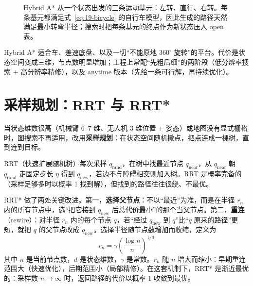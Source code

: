 \begin{figure}[htbp]
  \centering
  \caption{Hybrid A* 从一个状态出发的三条运动基元：左转、直行、右转。每条基元都满足式~\eqref{eq:19-bicycle} 的自行车模型，因此生成的路径天然满足最小转弯半径；搜索时把每条基元的终点作为新状态压入 open 表。}
  \label{fig:19-hybrid}
\end{figure}

Hybrid A* 适合车、差速底盘、以及一切“不能原地 $360^\circ$ 旋转”的平台。代价是状态空间变成三维，节点数明显增加；工程上常配“先粗后细”的两阶段（低分辨率搜索 + 高分辨率精修），以及 anytime 版本（先给一条可行解，再持续优化）。

\section{采样规划：RRT 与 RRT*}\label{sec:19-sampling}

当状态维数很高（机械臂 6--7 维、无人机 3 维位置 + 姿态）或地图没有显式栅格时，图搜索不再适用，改用\textbf{采样规划}：在状态空间随机撒点，把点连成一棵树，直到连到目标。

RRT（快速扩展随机树）每次采样 $q_{\mathrm{rand}}$，在树中找最近节点 $q_{\mathrm{near}}$，从 $q_{\mathrm{near}}$ 朝 $q_{\mathrm{rand}}$ 走固定步长 $\eta$ 得到 $q_{\mathrm{new}}$，若边不与障碍相交则加入树。RRT 是概率完备的（采样足够多时以概率 1 找到解），但找到的路径往往很绕、不最优。

RRT*\cite{karaman2011rrtstar} 做了两处关键改进。第一，\textbf{选择父节点}：不以“最近”为准，而是在半径 $r_n$ 内的所有节点中，选“把它接到 $q_{\mathrm{new}}$ 后总代价最小”的那个当父节点。第二，\textbf{重连}（rewire）：对半径 $r_n$ 内的每个节点 $q$，若“经过 $q_{\mathrm{new}}$ 到 $q$”比“$q$ 原来的路径”更短，就把 $q$ 的父节点改成 $q_{\mathrm{new}}$。选择半径随节点数增加而收缩，定义为
\begin{equation}
  r_n=\gamma\left(\frac{\log n}{n}\right)^{1/d}
  \label{eq:19-rrtstar}
\end{equation}
其中 $n$ 是当前节点数，$d$ 是状态维数，$\gamma$ 是常数。$r_n$ 随 $n$ 增大而缩小：早期重连范围大（快速优化），后期范围小（局部精修）。在这套机制下，RRT* 是渐近最优的：采样数 $n\to\infty$ 时，返回路径的代价以概率 1 收敛到最优。

